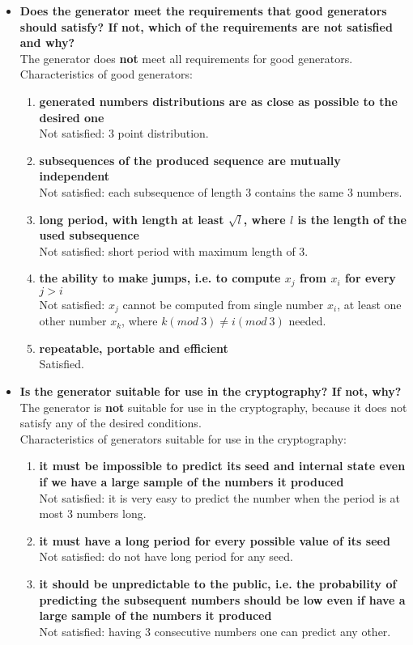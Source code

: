 \documentclass[a4paper,10pt]{article}
\begin{document}
\begin{itemize}
 \item \textbf{Does the generator meet the requirements that good generators should satisfy? If not, which of the requirements are not satisfied and why?} \\
  The generator does \textbf{not} meet all requirements for good generators. \\
  Characteristics of good generators:
   \begin{enumerate}
    \item \textbf{generated numbers distributions are as close as possible to the desired one} \\
    Not satisfied: 3 point distribution.
    \item \textbf{subsequences of the produced sequence are mutually independent} \\
    Not satisfied: each subsequence of length 3 contains the same 3 numbers.
    \item \textbf{long period, with length at least $\sqrt{l}$, where $l$ is the length of the used subsequence} \\
    Not satisfied: short period with maximum length of 3.
    \item \textbf{the ability to make jumps, i.e. to compute $x_j$ from $x_i$ for every $j > i$} \\
    Not satisfied: $x_j$ cannot be computed from single number $x_i$, at least one other number $x_k$, where $k(mod\ 3) \neq i(mod\ 3)$  needed.
    \item \textbf{repeatable, portable and efficient} \\
    Satisfied.
   \end{enumerate}
 
 \item \textbf{Is the generator suitable for use in the cryptography? If not, why?} \\
  The generator is \textbf{not} suitable for use in the cryptography, because it does not satisfy any of the desired conditions.\\
 Characteristics of generators suitable for use in the cryptography:
  \begin{enumerate}
   \item \textbf{it must be impossible to predict its seed and internal state even if we have a large sample of the numbers it produced} \\
   Not satisfied: it is very easy to predict the number when the period is at most 3 numbers long.
   \item \textbf{it must have a long period for every possible value of its seed} \\
   Not satisfied: do not have long period for any seed.
   \item \textbf{it should be unpredictable to the public, i.e. the probability of predicting the subsequent numbers should be low even if have a large sample of the numbers it produced} \\
   Not satisfied: having 3 consecutive numbers one can predict any other.
   \end{enumerate}

\end{itemize}
\end{document}
